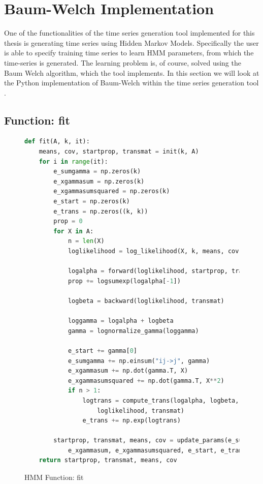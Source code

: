 
\chapter{Baum-Welch Implementation}\label{chapter:hmm-impl}

One of the functionalities of the time series generation tool implemented for this thesis is generating time series using Hidden Markov Models. Specifically the user is able to specify training time series to learn HMM parameters, from which the time-series is generated. The learning problem is, of course, solved using the Baum Welch algorithm, which the tool implements. In this section we will look at the Python implementation of Baum-Welch within the time series generation tool \parencite{tsgenerator}.

\section{Function: fit}

\begin{figure}
\begin{singlespace}
\begin{lstlisting}[language=Python]
def fit(A, k, it):
    means, cov, startprop, transmat = init(k, A)
    for i in range(it):
        e_sumgamma = np.zeros(k)
        e_xgammasum = np.zeros(k)
        e_xgammasumsquared = np.zeros(k)
        e_start = np.zeros(k)
        e_trans = np.zeros((k, k))
        prop = 0
        for X in A:
            n = len(X)
            loglikelihood = log_likelihood(X, k, means, cov)

            logalpha = forward(loglikelihood, startprop, transmat)
            prop += logsumexp(logalpha[-1])

            logbeta = backward(loglikelihood, transmat)

            loggamma = logalpha + logbeta
            gamma = lognormalize_gamma(loggamma)

            e_start += gamma[0]
            e_sumgamma += np.einsum("ij->j", gamma)
            e_xgammasum += np.dot(gamma.T, X)
            e_xgammasumsquared += np.dot(gamma.T, X**2)
            if n > 1:
                logtrans = compute_trans(logalpha, logbeta, \
                    loglikelihood, transmat)
                e_trans += np.exp(logtrans)

        startprop, transmat, means, cov = update_params(e_sumgamma, \
            e_xgammasum, e_xgammasumsquared, e_start, e_trans)
    return startprop, transmat, means, cov
\end{lstlisting}
\end{singlespace}
   
\caption{HMM Function: fit}    
\label{fig:hmm-fit-listing}
\end{figure}

